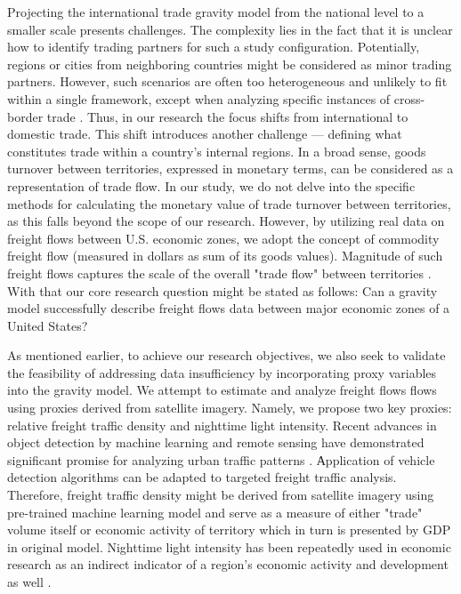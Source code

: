 Projecting the international trade gravity model from the national level to a smaller scale presents challenges. The complexity lies in the fact that it is unclear how to identify trading partners for such a study configuration. Potentially, regions or cities from neighboring countries might be considered as minor trading partners. However, such scenarios are often too heterogeneous and unlikely to fit within a single framework, except when analyzing specific instances of cross-border trade \parencite{capello2018measuring}. Thus, in our research the focus shifts from international to domestic trade. This shift introduces another challenge — defining what constitutes trade within a country's internal regions. In a broad sense, goods turnover between territories, expressed in monetary terms, can be considered as a representation of trade flow. In our study, we do not delve into the specific methods for calculating the monetary value of trade turnover between territories, as this falls beyond the scope of our research. However, by utilizing real data on freight flows between U.S. economic zones, we adopt the concept of commodity freight flow (measured in dollars as sum of its goods values). Magnitude of such freight flows captures the scale of the overall "trade flow" between territories \parencite{coughlin2013international, strocko2014freight}. With that our core research question might be stated as follows: Can a gravity model successfully describe freight flows data between major economic zones of a United States?

As mentioned earlier, to achieve our research objectives, we also seek to validate the feasibility of addressing data insufficiency by incorporating proxy variables into the gravity model. We attempt to estimate and analyze freight flows flows using proxies derived from satellite imagery. Namely, we propose two key proxies: relative freight traffic density and nighttime light intensity. Recent advances in object detection by machine learning and remote sensing have demonstrated significant promise for analyzing urban traffic patterns \parencite{leitloff2006automatic, zambanini2020detection}. Аpplication of vehicle detection algorithms can be adapted to targeted freight traffic analysis. Therefore, freight traffic density might be derived from satellite imagery using pre-trained machine learning model and serve as a measure of either "trade" volume itself or economic activity of territory which in turn is presented by GDP in original model. Nighttime light intensity has been repeatedly used in economic research as an indirect indicator of a region's economic activity and development as well \parencite{sutton2007estimation, henderson2012measuring, mellander2015night}. 

